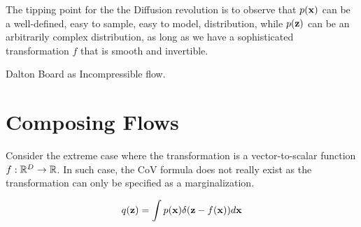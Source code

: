 \documentclass[a4paper, 11pt]{article}
\begin{document}
\begin{center} 
\end{center} 


The tipping point for the the Diffusion revolution is to observe that $p(\mbox{$\mbox{$\mathbf{x}$}$})$ can be a well-defined, easy to sample, easy to model, distribution, while $p(\mbox{$\mbox{$\mathbf{z}$}$})$ can be an arbitrarily complex distribution, as long as we have a sophisticated transformation $f$ that is smooth and invertible.


Dalton Board as Incompressible flow.

\section{Composing Flows}
Consider the extreme case where the transformation is a vector-to-scalar function $f: \mathbb{R}^D \to \mathbb{R}$. In such case, the CoV formula does not really exist as the transformation can only be specified as a marginalization.

\begin{align} \label{eq:extreme_case}
    q(\mbox{$\mbox{$\mathbf{z}$}$}) = \int p(\mbox{$\mbox{$\mathbf{x}$}$}) \delta (\mbox{$\mbox{$\mathbf{z}$}$} - f(\mbox{$\mbox{$\mathbf{x}$}$})) d\mbox{$\mbox{$\mathbf{x}$}$}
\end{align}
\end{document}
